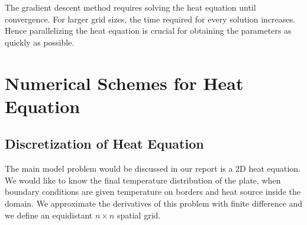 \documentclass[10pt,a4paper]{report}
\begin{document}
The gradient descent method requires solving the heat equation until convergence. For larger grid sizes, the time required for every solution increases. Hence parallelizing the heat equation is crucial for obtaining the parameters as quickly as possible.
%
% 
% 
%

\chapter{Numerical Schemes for Heat Equation}
\section{Discretization of Heat Equation}

The main model problem would be discussed in our report is a 2D heat equation. We would like to know the final temperature distribution of the plate, when boundary conditions are given temperature on borders and heat source inside the domain. We approximate the derivatives of this problem with finite difference and we define an equidistant $n \times  n$ spatial grid. 
\end{document}
